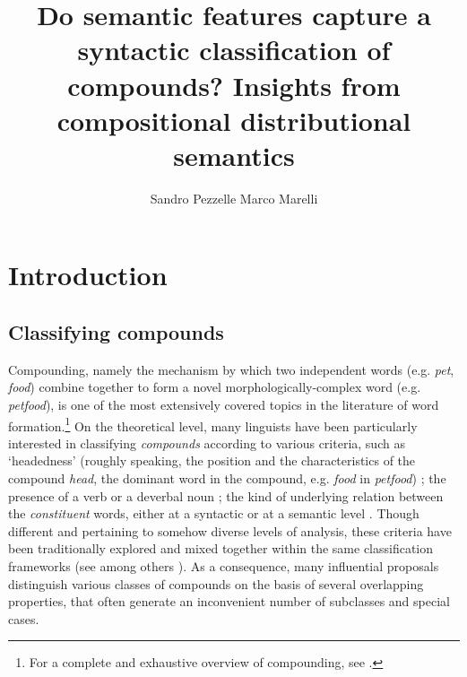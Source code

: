 \documentclass[output=paper]{langsci/langscibook}
\title{Do semantic features capture a syntactic classification of compounds? Insights from compositional distributional semantics}
\author{%
 Sandro Pezzelle\affiliation{CIMeC -- Center for Mind/Brain Sciences, University of Trento}\lastand
 Marco Marelli\affiliation{Department of Psychology, University of Milano-Bicocca}
}
\begin{document}
\maketitle

\section{Introduction}
\label{sec:introduction}

\subsection{Classifying compounds}\label{sec:class}


Compounding, namely the mechanism by which two independent words (e.g. \emph{pet}, \emph{food}) combine together to form a novel morphologically-complex word (e.g. \emph{petfood}), is one of the most extensively covered topics in the literature of word formation.\footnote{For a complete and exhaustive overview of compounding, see \cite{OHC}.} On the theoretical level, many linguists have been particularly interested in classifying \emph{compounds} according to various criteria, such as `headedness' (roughly speaking, the position and the characteristics of the compound \emph{head}, the dominant word in the compound, e.g. \emph{food} in \emph{petfood}) \citep{Bloomfield1933,fabb1998}; the presence of a verb or a deverbal noun \citep{marchand1969}; the kind of underlying relation between the \emph{constituent} words, either at a syntactic \citep{Bloomfield1933,bally1950,lees1960,SB2005,baroni2006,dressler2006,sbOHC} or at a semantic level \citep{levi1978,warren1978,fanselow1981}. Though different and pertaining to somehow diverse levels of analysis, these criteria have been traditionally explored and mixed together within the same classification frameworks (see among others \citealt{bauer2001,hasp2002,Booij2005}). As a consequence, many influential proposals distinguish various classes of compounds on the basis of several overlapping properties, that often generate an inconvenient number of subclasses and special cases.
\end{document}
